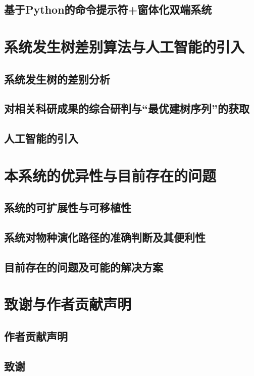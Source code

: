 \documentclass{article}
\begin{document}
\begin{multicols}{2}
\subsection{基于Python的命令提示符+窗体化双端系统}

\section{系统发生树差别算法与人工智能的引入}

\subsection{系统发生树的差别分析}

\subsection{对相关科研成果的综合研判与“最优建树序列”的获取}

\subsection{人工智能的引入}

\section{本系统的优异性与目前存在的问题}

\subsection{系统的可扩展性与可移植性}

\subsection{系统对物种演化路径的准确判断及其便利性}

\subsection{目前存在的问题及可能的解决方案}

\section{致谢与作者贡献声明}

\subsection{作者贡献声明}

\subsection{致谢}




\end{multicols}
\end{document}
